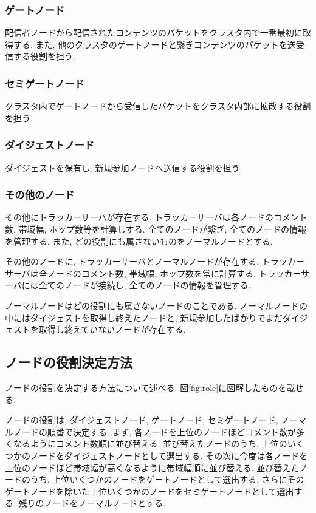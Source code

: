 \subsubsection{ゲートノード}
配信者ノードから配信されたコンテンツのパケットをクラスタ内で一番最初に取得する. また, 他のクラスタのゲートノードと繋ぎコンテンツのパケットを送受信する役割を担う.

\subsubsection{セミゲートノード}
クラスタ内でゲートノードから受信したパケットをクラスタ内部に拡散する役割を担う.

\subsubsection{ダイジェストノード}
ダイジェストを保有し, 新規参加ノードへ送信する役割を担う.

\subsubsection{その他のノード}
その他にトラッカーサーバが存在する. トラッカーサーバは各ノードのコメント数, 帯域幅, ホップ数等を計算しする. 全てのノードが繋ぎ, 全てのノードの情報を管理する. また, どの役割にも属さないものをノーマルノードとする.

その他のノードに, トラッカーサーバとノーマルノードが存在する. トラッカーサーバは全ノードのコメント数, 帯域幅, ホップ数を常に計算する. トラッカーサーバには全てのノードが接続し, 全てのノードの情報を管理する.

ノーマルノードはどの役割にも属さないノードのことである. ノーマルノードの中にはダイジェストを取得し終えたノードと, 新規参加したばかりでまだダイジェストを取得し終えていないノードが存在する.

\subsection{ノードの役割決定方法}
ノードの役割を決定する方法について述べる. 図\ref{fig:role}に図解したものを載せる.

ノードの役割は, ダイジェストノード, ゲートノード, セミゲートノード, ノーマルノードの順番で決定する. まず, 各ノードを上位のノードほどコメント数が多くなるようにコメント数順に並び替える. 並び替えたノードのうち, 上位のいくつかのノードをダイジェストノードとして選出する. その次に今度は各ノードを上位のノードほど帯域幅が高くなるように帯域幅順に並び替える. 並び替えたノードのうち, 上位いくつかのノードをゲートノードとして選出する. さらにそのゲートノードを除いた上位いくつかのノードをセミゲートノードとして選出する. 残りのノードをノーマルノードとする.

